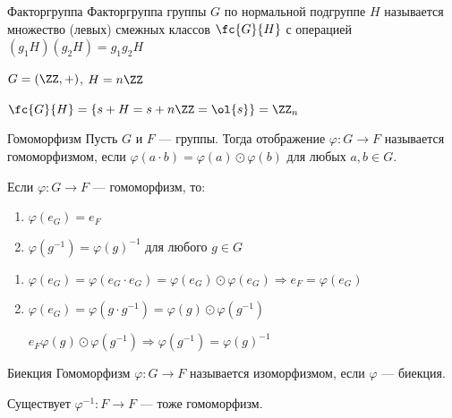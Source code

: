 \begin{defn}{Факторгруппа}{}
    Факторгруппа группы \( G \) по нормальной подгруппе \( H \)
    называется множество (левых) смежных классов \( \fc{G}{H} \) с операцией
    \( (g_1 H) (g_2 H) = g_1 g_2 H \)
\end{defn}

\begin{example}{}{}
    \( G = (\ZZ, +) \), \( H = n \ZZ \)

    \( \fc{G}{H} = \{ s + H = s + n \ZZ = \ol{s} \} = \ZZ_n \)
\end{example}

\begin{defn}{Гомоморфизм}{}
    Пусть \( G \) и \( F \) --- группы.
    Тогда отображение \( \varphi : G \to F \) называется гомоморфизмом,
    если \( \varphi(a \cdot b) = \varphi(a) \odot \varphi(b) \) для любых \( a, b \in G \).
\end{defn}

\begin{lemma}{}{}
    Если \( \varphi : G \to F \) --- гомоморфизм, то:
    \begin{enumerate}
        \item
            \( \varphi(e_G) = e_F \)
        \item
            \( \varphi(g^{-1}) = \varphi(g)^{-1} \) для любого \( g \in G \)
    \end{enumerate}
\end{lemma}

\begin{enumerate}
    \item
        \(
            \varphi(e_G) = \varphi(e_G \cdot e_G) = \varphi(e_G) \odot \varphi(e_G)
            \Rightarrow
            e_F = \varphi(e_G)
        \)
    \item
        \( \varphi(e_G) = \varphi(g \cdot g^{-1}) = \varphi(g) \odot \varphi(g^{-1}) \)

        \( e_F \varphi(g) \odot \varphi(g^{-1}) \Rightarrow \varphi(g^{-1}) = \varphi(g)^{-1} \)
\end{enumerate}

\begin{defn}{Биекция}{}
    Гомоморфизм \( \varphi : G \to F \) называется изоморфизмом,
    если \( \varphi \) --- биекция.
\end{defn}

\begin{exercise}{}{}
    Существует \( \varphi^{-1} : F \to F \) --- тоже гомоморфизм.
\end{exercise}

